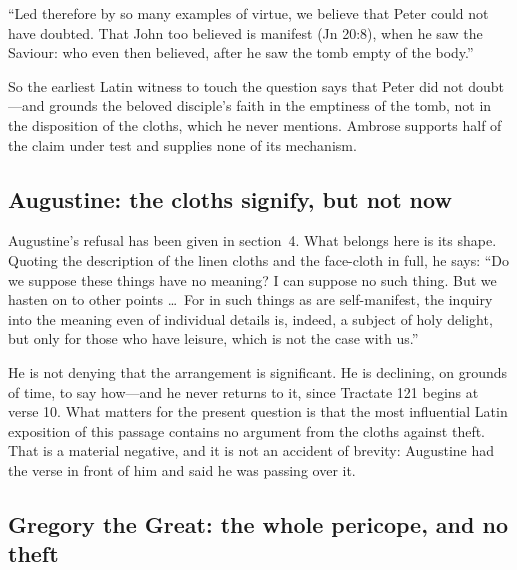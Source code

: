 \begin{studyframe}\small
``Led therefore by so many examples of virtue, we believe that Peter could not
have doubted. That John too believed is manifest (Jn 20:8), when he saw the
Saviour: who even then believed, after he saw the tomb empty of the
body.''
\end{studyframe}

So the earliest Latin witness to touch the question says that Peter did not
doubt---and grounds the beloved disciple's faith in the emptiness of the tomb,
not in the disposition of the cloths, which he never mentions. Ambrose supports
half of the claim under test and supplies none of its mechanism.

\subsection{Augustine: the cloths signify, but not now}

Augustine's refusal has been given in section~4. What belongs here is its
shape. Quoting the description of the linen cloths and the face-cloth in full,
he says: ``Do we suppose these things have no meaning? I can suppose no such
thing. But we hasten on to other points \ldots\ For in such things as are
self-manifest, the inquiry into the meaning even of individual details is,
indeed, a subject of holy delight, but only for those who have leisure, which
is not the case with us.''

He is not denying that the arrangement is significant. He is declining, on
grounds of time, to say how---and he never returns to it, since Tractate 121
begins at verse 10. What matters for the present question is that the most
influential Latin exposition of this passage contains no argument from the
cloths against theft. That is a material negative, and it is not an accident of
brevity: Augustine had the verse in front of him and said he was passing over
it.

\subsection{Gregory the Great: the whole pericope, and no theft}

